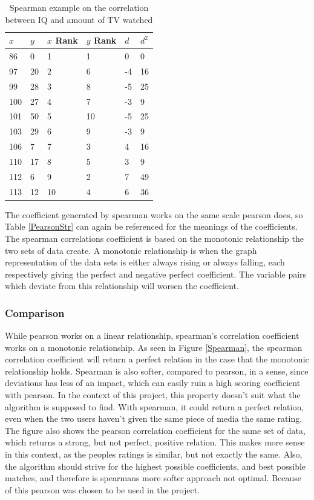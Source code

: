 \begin{table}[htb]
\centering
\begin{tabular}{|l|l|l|l|l|l|} \hline
	\textbf{$x$} & \textbf{$y$} & \textbf{$x$ Rank} & \textbf{$y$ Rank} & \textbf{$d$} & \textbf{$d^2$} \\ \hline
	86 & 0 & 1 & 1 & 0 & 0 \\ \hline
	97 & 20 & 2 & 6 & -4 & 16 \\ \hline
	99 & 28 & 3 & 8 & -5 & 25 \\ \hline
	100 & 27 & 4 & 7 & -3 & 9 \\ \hline
	101 & 50 & 5 & 10 & -5 & 25 \\ \hline
	103 & 29 & 6 & 9 & -3 & 9 \\ \hline
	106 & 7 & 7 & 3 & 4 & 16 \\ \hline
	110 & 17 & 8 & 5 & 3 & 9 \\ \hline
	112 & 6 & 9 & 2 & 7 & 49 \\ \hline
	113 & 12 & 10 & 4 & 6 & 36 \\ \hline
\end{tabular}
\caption{Spearman example on the correlation between IQ and amount of TV watched}
\label{SpearmanEx}
\end{table}

The coefficient generated by spearman works on the same scale pearson does, so Table \ref{PearsonStr} can again be referenced for the meanings of the coefficients. The spearman correlations coefficient is based on the monotonic relationship the two sets of data create\cite{Spearman2}. A monotonic relationship is when the graph representation of the data sets is either always rising or always falling, each respectively giving the perfect and negative perfect coefficient. The variable pairs which deviate from this relationship will worsen the coefficient.

\subsubsection{Comparison}

While pearson works on a linear relationship, spearman’s correlation coefficient works on a monotonic relationship. As seen in Figure \ref{Spearman}, the spearman correlation coefficient will return a perfect relation in the case that the monotonic relationship holds. Spearman is also softer, compared to pearson, in a sense, since deviations has less of an impact, which can easily ruin a high scoring coefficient with pearson. In the context of this project, this property doesn’t suit what the algorithm is supposed to find. With spearman, it could return a perfect relation, even when the two users haven’t given the same piece of media the same rating. The figure also shows the pearson correlation coefficient for the same set of data, which returns a strong, but not perfect, positive relation. This makes more sense in this context, as the peoples ratings is similar, but not exactly the same. Also, the algorithm should strive for the highest possible coefficients, and best possible matches, and therefore is spearmans more softer approach not optimal. Because of this pearson was chosen to be used in the project.

